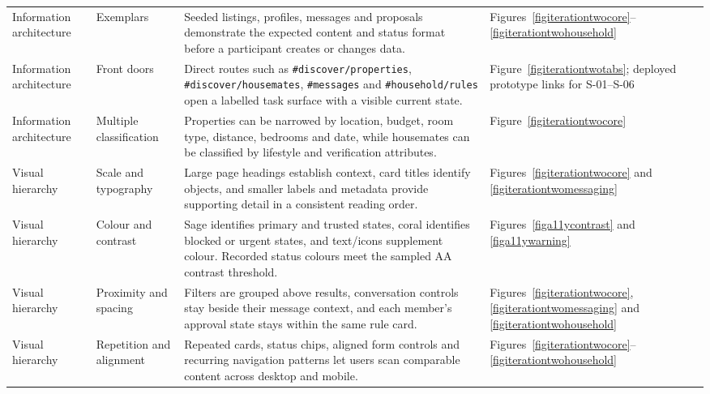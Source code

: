 \documentclass[11pt,a4paper]{article}
\begin{document}
{\begin{longtable}{@{}L{1.8cm}L{2.7cm}L{7.2cm}L{2.7cm}@{}}
    Information architecture & Exemplars &
    Seeded listings, profiles, messages and proposals demonstrate the expected
    content and status format before a participant creates or changes data. &
    Figures~\ref{figiterationtwocore}--\ref{figiterationtwohousehold}\\

    Information architecture & Front doors &
    Direct routes such as \texttt{\#discover/properties},
    \texttt{\#discover/housemates}, \texttt{\#messages} and
    \texttt{\#household/rules} open a labelled task surface with a visible
    current state. & Figure~\ref{figiterationtwotabs}; deployed prototype
    links for S-01--S-06\\

    Information architecture & Multiple classification &
    Properties can be narrowed by location, budget, room type, distance,
    bedrooms and date, while housemates can be classified by lifestyle and
    verification attributes. & Figure~\ref{figiterationtwocore}\\

    Visual hierarchy & Scale and typography &
    Large page headings establish context, card titles identify objects, and
    smaller labels and metadata provide supporting detail in a consistent
    reading order. & Figures~\ref{figiterationtwocore} and
    \ref{figiterationtwomessaging}\\

    Visual hierarchy & Colour and contrast &
    Sage identifies primary and trusted states, coral identifies blocked or
    urgent states, and text/icons supplement colour. Recorded status colours
    meet the sampled AA contrast threshold. & Figures~\ref{figa11ycontrast}
    and \ref{figa11ywarning}\\

    Visual hierarchy & Proximity and spacing &
    Filters are grouped above results, conversation controls stay beside their
    message context, and each member's approval state stays within the same rule
    card. & Figures~\ref{figiterationtwocore},
    \ref{figiterationtwomessaging} and \ref{figiterationtwohousehold}\\

    Visual hierarchy & Repetition and alignment &
    Repeated cards, status chips, aligned form controls and recurring navigation
    patterns let users scan comparable content across desktop and mobile. &
    Figures~\ref{figiterationtwocore}--\ref{figiterationtwohousehold}\\


\end{longtable}}
\end{document}
